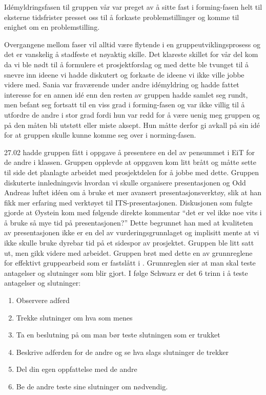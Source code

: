 \documentclass[a4paper,norsk,oneside]{article}
\begin{document}
Idémyldringsfasen til gruppen vår var preget av å sitte fast i forming-fasen helt til eksterne tidsfrister presset oss til å forkaste problemstillinger og komme til enighet om en problemstilling. 

Overgangene mellom faser vil alltid være flytende i en gruppeutviklingsprosess og det er vanskelig å stadfeste et nøyaktig skille. Det klareste skillet for vår del kom da vi ble nødt til å formulere et prosjektforslag og med dette ble tvunget til å snevre inn ideene vi hadde diskutert og forkaste de ideene vi ikke ville jobbe videre med. Sania var fraværende under andre idémyldring og hadde fattet interesse for en annen idé enn den resten av gruppen hadde samlet seg rundt, men befant seg fortsatt til en viss grad i forming-fasen og var ikke villig til å utfordre de andre i stor grad fordi hun var redd for å være uenig meg gruppen og på den måten bli utstøtt eller miste aksept. Hun måtte derfor gi avkall på sin idé for at gruppen skulle kunne komme seg over i norming-fasen.

27.02 hadde gruppen fått i oppgave å presentere en del av pensummet i EiT for de andre i klassen. Gruppen opplevde at oppgaven kom litt brått og måtte sette til side det planlagte arbeidet med prosjektdelen for å jobbe med dette. Gruppen diskuterte innledningsvis hvordan vi skulle organisere presentasjonen og Odd Andreas luftet idéen om å bruke et mer avansert presentasjonsverktøy, slik at han fikk mer erfaring med verktøyet til ITS-presentasjonen. Diskusjonen som fulgte gjorde at Øystein kom med følgende direkte kommentar “det er vel ikke noe vits i å bruke så mye tid på presentasjonen?” Dette begrunnet han med at kvaliteten av presentasjonen ikke er en del av vurderingsgrunnlaget og implisitt mente at vi ikke skulle bruke dyrebar tid på et sidespor av prosjektet. Gruppen ble litt satt ut, men gikk videre med arbeidet. Gruppen brøt med dette en av grunnreglene for effektivt gruppearbeid som er fastslått i \cite{schwarz}. Grunnreglen sier at man skal teste antagelser og slutninger som blir gjort. I følge Schwarz er det 6 trinn i å teste antagelser og slutninger:

\begin{enumerate}
\item Observere adferd
\item Trekke slutninger om hva som menes
\item Ta en beslutning på om man bør teste slutningen som er trukket
\item Beskrive adferden for de andre og se hva slags slutninger de trekker
\item Del din egen oppfattelse med de andre
\item Be de andre teste sine slutninger om nødvendig.
\end{enumerate}
\end{document}
